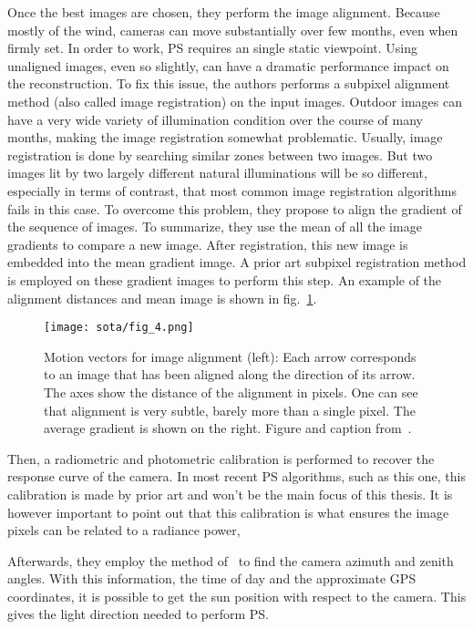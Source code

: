 Once the best images are chosen, they perform the image alignment. Because mostly of the wind, cameras can move substantially over few months, even when firmly set. In order to work, PS requires an single static viewpoint. Using unaligned images, even so slightly, can have a dramatic performance impact on the reconstruction. To fix this issue, the authors performs a subpixel alignment method (also called image registration) on the input images. Outdoor images can have a very wide variety of illumination condition over the course of many months, making the image registration somewhat problematic. Usually, image registration is done by searching similar zones between two images. But two images lit by two largely different natural illuminations will be so different, especially in terms of contrast, that most common image registration algorithms fails in this case. To overcome this problem, they propose to align the gradient of the sequence of images. To summarize, they use the mean of all the image gradients to compare a new image. After registration, this new image is embedded into the mean gradient image. A prior art subpixel registration method is employed on these gradient images to perform this step. An example of the alignment distances and mean image is shown in fig.~\ref{fig:ackermann-alignment}.

\begin{figure}
\centering
\texttt{[image: sota/fig\_4.png]}
\caption{Motion vectors for image alignment (left): Each arrow corresponds to an image that has been aligned along the direction of its arrow. The axes show the distance of the alignment in pixels. One can see that alignment is very subtle, barely more than a single pixel. The average gradient is shown on the right. Figure and caption from~\cite{ackermann-cvpr-12}.}
\label{fig:ackermann-alignment}
\end{figure}

Then, a radiometric and photometric calibration is performed to recover the response curve of the camera. In most recent PS algorithms, such as this one, this calibration is made by prior art and won't be the main focus of this thesis. It is however important to point out that this calibration is what ensures the image pixels can be related to a radiance power, 

Afterwards, they employ the method of~\cite{lalonde-ijcv-10} to find the camera azimuth and zenith angles. With this information, the time of day and the approximate GPS coordinates, it is possible to get the sun position with respect to the camera. This gives the light direction needed to perform PS.

